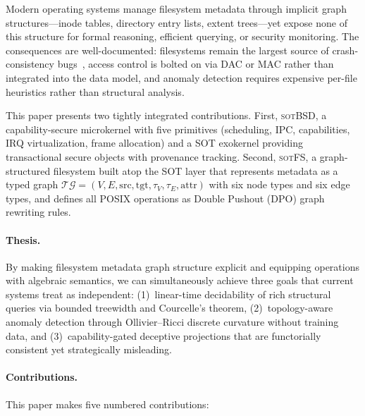 \documentclass[11pt,a4paper]{article}
\theoremstyle{definition}
\theoremstyle{remark}
\newcommand{\TG}{\ensuremath{\mathcal{TG}}}
\newcommand{\sotfs}{\textsc{sotFS}}
\newcommand{\sotbsd}{\textsc{sotBSD}}
\begin{document}
Modern operating systems manage filesystem metadata through implicit
graph structures---inode tables, directory entry lists, extent
trees---yet expose none of this structure for formal reasoning,
efficient querying, or security monitoring. The consequences are
well-documented: filesystems remain the largest source of
crash-consistency bugs~\cite{pillai2014}, access control is bolted on
via DAC or MAC rather than integrated into the data model, and anomaly
detection requires expensive per-file heuristics rather than
structural analysis.

This paper presents two tightly integrated contributions. First,
\sotbsd{}, a capability-secure microkernel with five primitives
(scheduling, IPC, capabilities, IRQ virtualization, frame allocation)
and a SOT exokernel providing transactional secure objects with
provenance tracking. Second, \sotfs{}, a graph-structured filesystem
built atop the SOT layer that represents metadata as a typed graph
$\TG = (V, E, \mathrm{src}, \mathrm{tgt}, \tau_V, \tau_E,
\mathrm{attr})$ with six node types and six edge types, and defines
all POSIX operations as Double Pushout (DPO) graph rewriting rules.

\paragraph{Thesis.}
By making filesystem metadata graph structure explicit and equipping
operations with algebraic semantics, we can simultaneously achieve
three goals that current systems treat as independent:
(1)~linear-time decidability of rich structural queries via bounded
treewidth and Courcelle's theorem,
(2)~topology-aware anomaly detection through Ollivier--Ricci discrete
curvature without training data, and
(3)~capability-gated deceptive projections that are functorially
consistent yet strategically misleading.

\paragraph{Contributions.}
This paper makes five numbered contributions:
\end{document}
